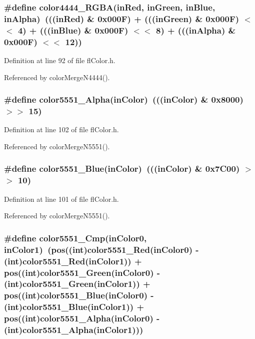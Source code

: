 \subsubsection{\setlength{\rightskip}{0pt plus 5cm}\#define color4444\_\-RGBA(in\-Red, in\-Green, in\-Blue, in\-Alpha)~(((in\-Red) \& 0x000F) + (((in\-Green) \& 0x000F) $<$$<$ 4) + (((in\-Blue) \& 0x000F) $<$$<$ 8) + (((in\-Alpha) \& 0x000F) $<$$<$ 12))}\label{flColor_8h_87a7da302fe9e236a38c47bdca3d311e}




Definition at line 92 of file fl\-Color.h.

Referenced by color\-Merge\-N4444().
\subsubsection{\setlength{\rightskip}{0pt plus 5cm}\#define color5551\_\-Alpha(in\-Color)~(((in\-Color) \& 0x8000) $>$$>$ 15)}\label{flColor_8h_865a555aa1a09d6ff723fd8c5272627d}




Definition at line 102 of file fl\-Color.h.

Referenced by color\-Merge\-N5551().
\subsubsection{\setlength{\rightskip}{0pt plus 5cm}\#define color5551\_\-Blue(in\-Color)~(((in\-Color) \& 0x7C00) $>$$>$ 10)}\label{flColor_8h_f1507d1e0a6d99884810a3d336696307}




Definition at line 101 of file fl\-Color.h.

Referenced by color\-Merge\-N5551().
\subsubsection{\setlength{\rightskip}{0pt plus 5cm}\#define color5551\_\-Cmp(in\-Color0, in\-Color1)~(pos((int)color5551\_\-Red(in\-Color0) - (int)color5551\_\-Red(in\-Color1)) + pos((int)color5551\_\-Green(in\-Color0) - (int)color5551\_\-Green(in\-Color1)) + pos((int)color5551\_\-Blue(in\-Color0) - (int)color5551\_\-Blue(in\-Color1)) + pos((int)color5551\_\-Alpha(in\-Color0) - (int)color5551\_\-Alpha(in\-Color1)))}\label{flColor_8h_2464768e69053d0053fa9aba68c24e62}




